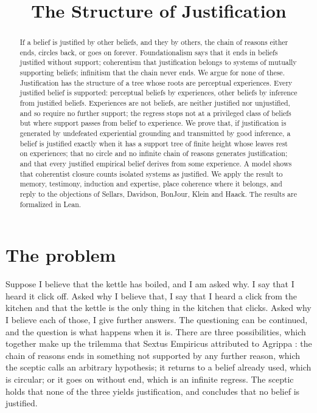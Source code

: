 \documentclass{situationist-preprint}
\title{The Structure of Justification}
\begin{document}
\maketitle

\begin{abstract}
If a belief is justified by other beliefs, and they by others, the chain of reasons either ends, circles back, or goes on forever. Foundationalism says that it ends in beliefs justified without support; coherentism that justification belongs to systems of mutually supporting beliefs; infinitism that the chain never ends. We argue for none of these. Justification has the structure of a tree whose roots are perceptual experiences. Every justified belief is supported: perceptual beliefs by experiences, other beliefs by inference from justified beliefs. Experiences are not beliefs, are neither justified nor unjustified, and so require no further support; the regress stops not at a privileged class of beliefs but where support passes from belief to experience. We prove that, if justification is generated by undefeated experiential grounding and transmitted by good inference, a belief is justified exactly when it has a support tree of finite height whose leaves rest on experiences; that no circle and no infinite chain of reasons generates justification; and that every justified empirical belief derives from some experience. A model shows that coherentist closure counts isolated systems as justified. We apply the result to memory, testimony, induction and expertise, place coherence where it belongs, and reply to the objections of Sellars, Davidson, BonJour, Klein and Haack. The results are formalized in Lean.
\end{abstract}

\section{The problem}

Suppose I believe that the kettle has boiled, and I am asked why. I say that I heard it click off. Asked why I believe that, I say that I heard a click from the kitchen and that the kettle is the only thing in the kitchen that clicks. Asked why I believe each of those, I give further answers. The questioning can be continued, and the question is what happens when it is. There are three possibilities, which together make up the trilemma that Sextus Empiricus attributed to Agrippa \citep[I.164--177]{Sextus}: the chain of reasons ends in something not supported by any further reason, which the sceptic calls an arbitrary hypothesis; it returns to a belief already used, which is circular; or it goes on without end, which is an infinite regress. The sceptic holds that none of the three yields justification, and concludes that no belief is justified.
\end{document}
